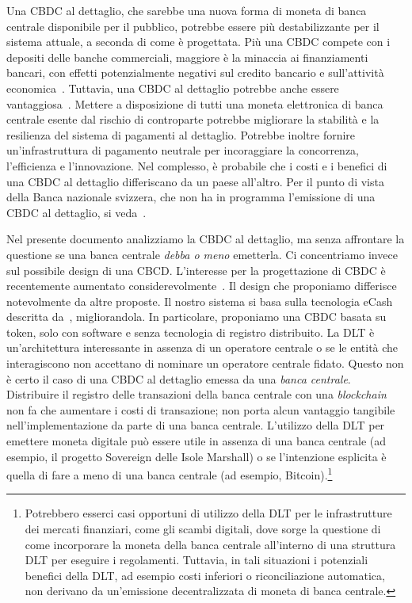 \documentclass{article}
\begin{document}
Una CBDC al dettaglio, che sarebbe una nuova forma di moneta di banca 
centrale disponibile per il pubblico, potrebbe essere più destabilizzante 
per il sistema attuale, a seconda di come è progettata. Più una CBDC 
compete con i depositi delle banche commerciali, maggiore è la minaccia 
ai finanziamenti bancari, con effetti potenzialmente negativi sul credito 
bancario e sull'attività economica~\cite[vedi][]{Agur}. Tuttavia, una 
CBDC al dettaglio potrebbe anche essere vantaggiosa~\cite[vedi][]{Bordo,Berentsen,Bindseil,Niepelt,Riksbank,BoE}. 
Mettere a disposizione di tutti una moneta elettronica di banca centrale 
esente dal rischio di controparte potrebbe migliorare la stabilità e la 
resilienza del sistema di pagamenti al dettaglio. Potrebbe inoltre fornire 
un'infrastruttura di pagamento neutrale per incoraggiare la concorrenza, 
l'efficienza e l'innovazione. Nel complesso, è probabile che i costi e i 
benefici di una CBDC al dettaglio differiscano da un paese all'altro. Per 
il punto di vista della Banca nazionale svizzera, che non ha in programma 
l'emissione di una CBDC al dettaglio, si veda~\cite{Jordan}.

Nel presente documento analizziamo la CBDC al dettaglio, ma senza 
affrontare la questione se una banca centrale \emph{debba o meno} emetterla. 
Ci concentriamo invece sul possibile design di una CBCD. L'interesse 
per la progettazione di CBDC è recentemente aumentato 
considerevolmente~\cite[si, veda ad esempio,][]{Allen,BoE}. Il design che 
proponiamo differisce notevolmente da altre proposte. Il nostro sistema 
si basa sulla tecnologia eCash descritta da~\cite{Chaum1983,Chaum1990}, 
migliorandola. In particolare, proponiamo una CBDC basata su token, solo 
con software e senza tecnologia di registro distribuito. La DLT è 
un'architettura interessante in assenza di un operatore centrale o se le 
entità che interagiscono non accettano di nominare un operatore centrale 
fidato. Questo non è certo il caso di una CBDC al dettaglio emessa da una 
\emph{banca centrale}. Distribuire il registro delle transazioni della 
banca centrale con una \textit{blockchain} non fa che aumentare i costi 
di transazione; non porta alcun vantaggio tangibile nell'implementazione 
da parte di una banca centrale. L'utilizzo della DLT per emettere moneta 
digitale può essere utile in assenza di una banca centrale (ad esempio, 
il progetto Sovereign delle Isole Marshall) o se l'intenzione esplicita 
è quella di fare a meno di una banca centrale (ad esempio, 
Bitcoin).\footnote{Potrebbero esserci casi opportuni di utilizzo della 
DLT per le infrastrutture dei mercati finanziari, come gli scambi digitali, 
dove sorge la questione di come incorporare la moneta della banca centrale 
all'interno di una struttura DLT per eseguire i regolamenti. Tuttavia, 
in tali situazioni i potenziali benefici della DLT, ad esempio costi 
inferiori o riconciliazione automatica, non derivano da un'emissione 
decentralizzata di moneta di banca centrale.}
\end{document}
